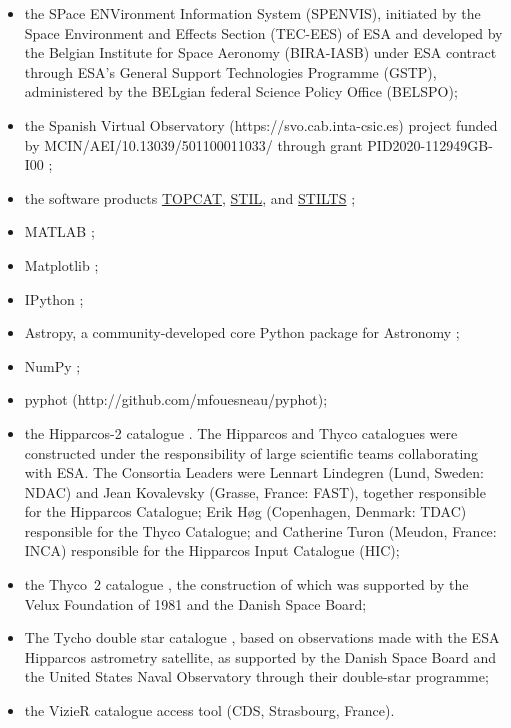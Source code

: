 \documentclass{aa}
\newcommand{\hip}{{ Hipparcos}\xspace}
\newcommand{\tyc}{{ Thyco}\xspace}
\newcommand{\tyctwo}{{ Thyco~2}\xspace}
\begin{document}
\begin{appendix}
\begin{itemize}
\item the SPace ENVironment Information System (SPENVIS), initiated by the Space Environment and Effects Section (TEC-EES) of ESA and developed by the Belgian Institute for Space Aeronomy (BIRA-IASB) under ESA contract through ESA’s General Support Technologies Programme (GSTP), administered by the BELgian federal Science Policy Office (BELSPO);
\item the Spanish Virtual Observatory (https://svo.cab.inta-csic.es) project funded by MCIN/AEI/10.13039/501100011033/ through grant PID2020-112949GB-I00 \citep{SVO};
\item the software products \href{http://www.starlink.ac.uk/topcat/}{TOPCAT}, \href{http://www.starlink.ac.uk/stil}{STIL}, and \href{http://www.starlink.ac.uk/stilts}{STILTS} \citep{2005ASPC..347...29T,2006ASPC..351..666T};
\item MATLAB \citep{MATLAB:2018};
\item Matplotlib \citep{Hunter:2007};
\item IPython \citep{PER-GRA:2007};  
\item Astropy, a community-developed core Python package for Astronomy \citep{2018AJ....156..123A};
\item  NumPy \citep{harris2020array};
\item pyphot
(http://github.com/mfouesneau/pyphot);
\item the \hip-2 catalogue \citep{2007A&A...474..653V}. The \hip and \tyc catalogues were constructed under the responsibility of large scientific teams collaborating with ESA. The Consortia Leaders were Lennart Lindegren (Lund, Sweden: NDAC) and Jean Kovalevsky (Grasse, France: FAST), together responsible for the \hip Catalogue; Erik H{\o}g (Copenhagen, Denmark: TDAC) responsible for the \tyc Catalogue; and Catherine Turon (Meudon, France: INCA) responsible for the \hip Input Catalogue (HIC);  
\item the \tyctwo catalogue \citep{2000A&A...355L..27H}, the construction of which was supported by the Velux Foundation of 1981 and the Danish Space Board;
\item The Tycho double star catalogue \citep[TDSC,][]{2002A&A...384..180F}, based on observations made with the ESA \hip astrometry satellite, as supported by the Danish Space Board and the United States Naval Observatory through their double-star programme;
\item the VizieR catalogue access tool (CDS, Strasbourg, France).
\end{itemize}


\end{appendix}
\end{document}
